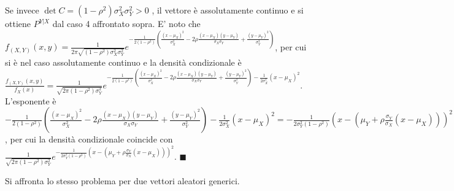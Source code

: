 \documentclass{article}
\begin{document}
Se invece $\det C=\left( 1-\rho ^{2}\right) \sigma _{X}^{2}\sigma _{Y}^{2}>0$%
, il vettore \`{e} assolutamente continuo e si ottiene $P^{Y|X}$ dal caso 4
affrontato sopra. E' noto che $f_{\left( X,Y\right) }\left( x,y\right) =%
\frac{1}{2\pi \sqrt{\left( 1-\rho ^{2}\right) \sigma _{X}^{2}\sigma _{Y}^{2}}%
}e^{-\frac{1}{2\left( 1-\rho ^{2}\right) }\left( \frac{\left( x-\mu
_{X}\right) ^{2}}{\sigma _{X}^{2}}-2\rho \frac{\left( x-\mu _{X}\right)
\left( y-\mu _{Y}\right) }{\sigma _{X}\sigma _{Y}}+\frac{\left( y-\mu
_{Y}\right) ^{2}}{\sigma _{Y}^{2}}\right) }$, per cui si \`{e} nel caso
assolutamente continuo e la densit\`{a} condizionale \`{e} $\frac{f_{\left(
X,Y\right) }\left( x,y\right) }{f_{X}\left( x\right) }=\frac{1}{\sqrt{2\pi
\left( 1-\rho ^{2}\right) \sigma _{Y}^{2}}}e^{-\frac{1}{2\left( 1-\rho
^{2}\right) }\left( \frac{\left( x-\mu _{X}\right) ^{2}}{\sigma _{X}^{2}}%
-2\rho \frac{\left( x-\mu _{X}\right) \left( y-\mu _{Y}\right) }{\sigma
_{X}\sigma _{Y}}+\frac{\left( y-\mu _{Y}\right) ^{2}}{\sigma _{Y}^{2}}%
\right) -\frac{1}{2\sigma _{X}^{2}}\left( x-\mu _{X}\right) ^{2}}$.
L'esponente \`{e} $-\frac{1}{2\left( 1-\rho ^{2}\right) }\left( \frac{\left(
x-\mu _{X}\right) ^{2}}{\sigma _{X}^{2}}-2\rho \frac{\left( x-\mu
_{X}\right) \left( y-\mu _{Y}\right) }{\sigma _{X}\sigma _{Y}}+\frac{\left(
y-\mu _{Y}\right) ^{2}}{\sigma _{Y}^{2}}\right) -\frac{1}{2\sigma _{X}^{2}}%
\left( x-\mu _{X}\right) ^{2}=-\frac{1}{2\sigma _{Y}^{2}\left( 1-\rho
^{2}\right) }\left( x-\left( \mu _{Y}+\rho \frac{\sigma _{Y}}{\sigma _{X}}%
\left( x-\mu _{X}\right) \right) \right) ^{2}$, per cui la densit\`{a}
condizionale coincide con $\frac{1}{\sqrt{2\pi \left( 1-\rho ^{2}\right)
\sigma _{Y}^{2}}}e^{-\frac{1}{2\sigma _{Y}^{2}\left( 1-\rho ^{2}\right) }%
\left( x-\left( \mu _{Y}+\rho \frac{\sigma _{Y}}{\sigma _{X}}\left( x-\mu
_{X}\right) \right) \right) ^{2}}$. $\blacksquare $

Si affronta lo stesso problema per due vettori aleatori generici.
\end{document}
